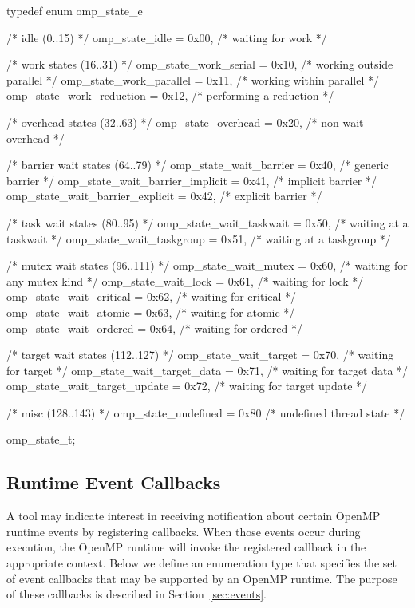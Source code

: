 \documentclass{article}
\begin{document}
\begin{boxedcode}
typedef enum omp\_state\_e {
  /* idle (0..15) */
  omp\_state\_idle                   = 0x00, /* waiting for work           */

  /* work states (16..31) */
  omp\_state\_work\_serial            = 0x10, /* working outside parallel   */
  omp\_state\_work\_parallel          = 0x11, /* working within parallel    */
  omp\_state\_work\_reduction         = 0x12, /* performing a reduction     */

  /* overhead states (32..63) */
  omp\_state\_overhead               = 0x20, /* non-wait overhead          */

  /* barrier wait states (64..79) */
  omp\_state\_wait\_barrier           = 0x40, /* generic barrier            */
  omp\_state\_wait\_barrier\_implicit  = 0x41, /* implicit barrier           */
  omp\_state\_wait\_barrier\_explicit  = 0x42, /* explicit barrier           */
    
  /* task wait states (80..95) */
  omp\_state\_wait\_taskwait          = 0x50, /* waiting at a taskwait      */
  omp\_state\_wait\_taskgroup         = 0x51, /* waiting at a taskgroup     */

  /* mutex wait states (96..111) */
  omp\_state\_wait\_mutex             = 0x60, /* waiting for any mutex kind */
  omp\_state\_wait\_lock              = 0x61, /* waiting for lock           */
  omp\_state\_wait\_critical          = 0x62, /* waiting for critical       */
  omp\_state\_wait\_atomic            = 0x63, /* waiting for atomic         */
  omp\_state\_wait\_ordered           = 0x64, /* waiting for ordered        */
  
  /* target wait states (112..127) */
  omp\_state\_wait\_target            = 0x70, /* waiting for target         */ 
  omp\_state\_wait\_target\_data       = 0x71, /* waiting for target data    */ 
  omp\_state\_wait\_target\_update     = 0x72, /* waiting for target update  */ 

  /* misc (128..143) */
  omp\_state\_undefined              = 0x80  /* undefined thread state     */
} omp\_state\_t;
\end{boxedcode}
\clearpage
\subsection{Runtime Event Callbacks}
\label{appendix:ompt-types:events}

A tool may indicate interest in receiving notification about certain OpenMP runtime events by registering callbacks. 
When those events occur during execution, the OpenMP runtime will invoke the registered callback in the appropriate context.
Below we define an enumeration type that specifies the set of event callbacks that may be supported by an OpenMP runtime. 
The purpose of these callbacks is described in Section~\ref{sec:events}. 
\end{document}
